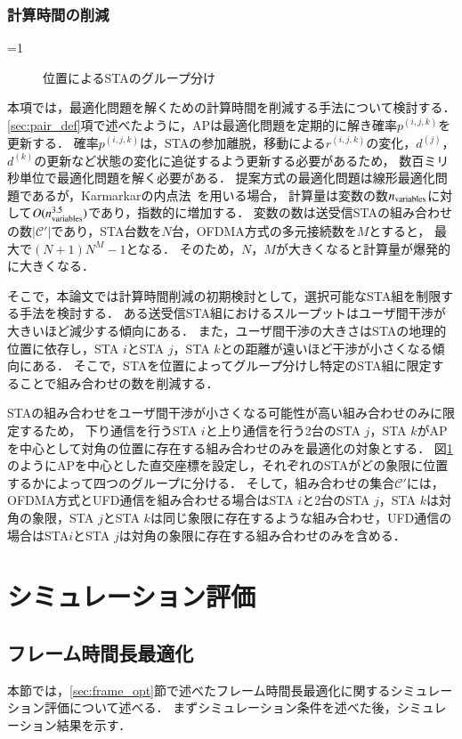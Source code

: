 \documentclass[master]{kuisthesis}		%
\newcommand{\pijk}{p^{(i,j,k)}}
\newcommand{\rijk}{r^{(i,j,k)}}
\newcommand{\mthc}{\mathcal C}
\newcommand{\mthcd}{{\mathcal C}'}
\newcounter{flagFig}
\begin{document}
		\subsubsection{計算時間の削減}\label{sec:time}
			\ifnum\value{flagFig}=1 {\begin{figure}[htbp]
				\centering
				\caption{位置によるSTAのグループ分け}
				\label{fig:time_image}
			\end{figure}}\fi
			本項では，最適化問題を解くための計算時間を削減する手法について検討する．
			\ref{sec:pair_def}項で述べたように，APは最適化問題を定期的に解き確率$\pijk$を更新する．
			確率$\pijk$は，STAの参加離脱，移動による$\rijk$の変化，$d^{(j)}$，$d^{(k)}$の更新など状態の変化に追従するよう更新する必要があるため，
			数百ミリ秒単位で最適化問題を解く必要がある．
			提案方式の最適化問題は線形最適化問題であるが，Karmarkarの内点法~\cite{karmarkar}を用いる場合，
			計算量は変数の数$n_{\rm variables}$に対して$O(n_{\rm variables}^{3.5})$であり，指数的に増加する．
			変数の数は送受信STAの組み合わせの数$|{\mthcd}|$であり，STA台数を$N$台，OFDMA方式の多元接続数を$M$とすると，
			最大で$(N+1)N^M-1$となる．
			そのため，$N$，$M$が大きくなると計算量が爆発的に大きくなる．
			\par
			そこで，本論文では計算時間削減の初期検討として，選択可能なSTA組を制限する手法を検討する．
			ある送受信STA組におけるスループットはユーザ間干渉が大きいほど減少する傾向にある．
			また，ユーザ間干渉の大きさはSTAの地理的位置に依存し，STA $i$とSTA $j$，STA $k$との距離が遠いほど干渉が小さくなる傾向にある．
			そこで，STAを位置によってグループ分けし特定のSTA組に限定することで組み合わせの数を削減する．
			\par
			STAの組み合わせをユーザ間干渉が小さくなる可能性が高い組み合わせのみに限定するため，
			下り通信を行うSTA $i$と上り通信を行う2台のSTA $j$，STA $k$がAPを中心として対角の位置に存在する組み合わせのみを最適化の対象とする．
			図\ref{fig:time_image}のようにAPを中心とした直交座標を設定し，それぞれのSTAがどの象限に位置するかによって四つのグループに分ける．
			そして，組み合わせの集合$\mthc'$には，OFDMA方式とUFD通信を組み合わせる場合はSTA $i$と2台のSTA $j$，STA $k$は対角の象限，STA $j$とSTA $k$は同じ象限に存在するような組み合わせ，UFD通信の場合はSTA$i$とSTA $j$は対角の象限に存在する組み合わせのみを含める．

\section{シミュレーション評価}
	\subsection{フレーム時間長最適化}
		本節では，\ref{sec:frame_opt}節で述べたフレーム時間長最適化に関するシミュレーション評価について述べる．
		まずシミュレーション条件を述べた後，シミュレーション結果を示す．
\end{document}
